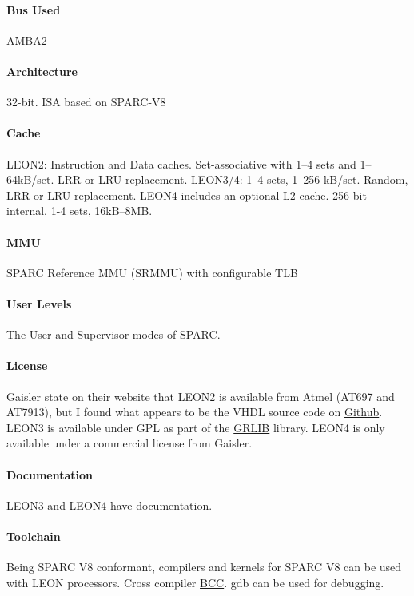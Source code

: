 \paragraph{Bus Used} AMBA2
\paragraph{Architecture} 32-bit. ISA based on SPARC-V8
\paragraph{Cache} LEON2: Instruction and Data caches. Set-associative with 1--4 sets and 1--64kB/set. LRR or LRU replacement. LEON3/4: 1--4 sets, 1--256 kB/set. Random, LRR or LRU replacement. LEON4 includes an optional L2 cache. 256-bit internal, 1-4 sets, 16kB--8MB.
\paragraph{MMU} SPARC Reference MMU (SRMMU) with configurable TLB
\paragraph{User Levels} The User and Supervisor modes of SPARC.
\paragraph{License} Gaisler state on their website that LEON2 is available from Atmel (AT697 and AT7913), but I found what appears to be the VHDL source code on \href{https://github.com/Galland/LEON2}{Github}. LEON3 is available under GPL as part of the \href{http://www.gaisler.com/index.php/products/ipcores/soclibrary}{GRLIB} library. LEON4 is only available under a commercial license from Gaisler.
\paragraph{Documentation} \href{http://www.gaisler.com/doc/leon3_product_sheet.pdf}{LEON3} and \href{http://www.gaisler.com/doc/LEON4_32-bit_processor_core.pdf}{LEON4} have documentation.
\paragraph{Toolchain} Being SPARC V8 conformant, compilers and kernels for SPARC V8 can be used with LEON processors. Cross compiler \href{http://www.gaisler.com/index.php/products?option=com_content&task=view&id=147}{BCC}. gdb can be used for debugging.
